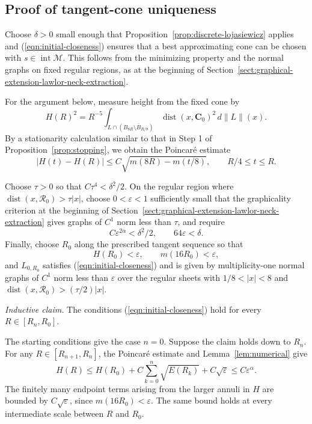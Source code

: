 \documentclass[11pt,a4paper]{article}
\numberwithin{equation}{section}
\theoremstyle{definition}
\theoremstyle{remark}
\newcommand{\dist}{\operatorname{dist}}
\begin{document}
	\subsection{Proof of tangent-cone uniqueness}
	
	Choose $\delta>0$ small enough that
	Proposition~\ref{prop:discrete-lojasiewicz} applies and
	(\ref{eqn:initial-closeness}) ensures that a best approximating cone
	can be chosen with $s\in\operatorname{int}\mathcal M$.
	This follows from the minimizing property and the normal graphs on fixed
	regular regions, as at the beginning of Section~\ref{sect:graphical-extension-lawlor-neck-extraction}.
	
	For the argument below, measure height from the fixed cone by
	\[
	H(R)^2=R^{-5}\int_{L\cap(B_{8R}\setminus\overline B_{R/8})}
	\dist(x,\mathbf C_0)^2\,d\|L\|(x).
	\]
	By a stationarity calculation similar to that in Step 1 of
	Proposition~\ref{prop:stopping}, we obtain the Poincar\'e estimate
	\[
	|H(t)-H(R)|\le C\sqrt{m(8R)-m(t/8)},
	\qquad R/4\le t\le R.
	\]
	
	Choose $\tau>0$ so that $C\tau^4<\delta^2/2$. On the regular region
	where $\dist(x,\mathcal R_0)>\tau|x|$, choose
	$0<\varepsilon<1$ sufficiently small that the graphicality
	criterion at the beginning of
	Section~\ref{sect:graphical-extension-lawlor-neck-extraction} gives graphs of
	$C^1$ norm less than $\tau$, and require
	\[
	C\varepsilon^{2\alpha}<\delta^2/2,\qquad
	64\varepsilon<\delta.
	\]
	Finally, choose $R_0$ along the prescribed tangent sequence so that
	\[
	H(R_0)<\varepsilon,\qquad m(16R_0)<\varepsilon,
	\]
	and $L_{0,R_0}$ satisfies (\ref{eqn:initial-closeness}) and is given by
	multiplicity-one normal graphs of $C^1$ norm less than $\varepsilon$
	over the regular sheets with $1/8<|x|<8$ and
	$\dist(x,\mathcal R_0)>(\tau/2)|x|$.
	
	\emph{Inductive claim.} The conditions
	(\ref{eqn:initial-closeness}) hold for every $R\in[R_n,R_0]$.
	
	The starting conditions give the case $n=0$. Suppose the claim holds
	down to $R_n$. For any $R\in[R_{n+1},R_n]$, the Poincar\'e estimate and
	Lemma~\ref{lem:numerical} give
	\[
	H(R)\le H(R_0)+C\sum_{k=0}^n\sqrt{E(R_k)}+C\sqrt\varepsilon
	\le C\varepsilon^\alpha.
	\]
	The finitely many endpoint terms arising from the larger annuli in
	$H$ are bounded by $C\sqrt\varepsilon$, since $m(16R_0)<\varepsilon$.
	The same bound holds at every intermediate scale between $R$ and $R_0$.
	
\end{document}
